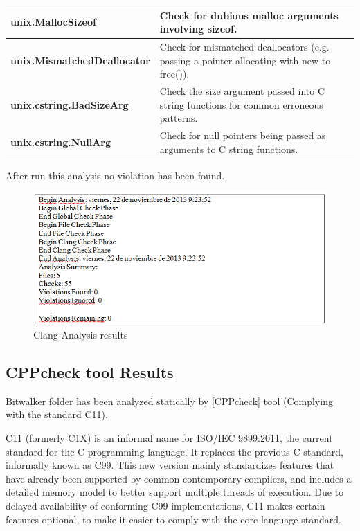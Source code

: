 {\begin{longtable}{||p{}|p{}||}
    \\
    \hline
    \textbf{unix.MallocSizeof}
& Check for dubious malloc arguments involving sizeof.
    \\
    \hline
    \textbf{unix.MismatchedDeallocator}
& Check for mismatched deallocators (e.g. passing a pointer allocating with new to free()).
    \\
    \hline
    \textbf{unix.cstring.BadSizeArg}
& Check the size argument passed into C string functions for common erroneous patterns.
    \\
    \hline
    \textbf{unix.cstring.NullArg}
& Check for null pointers being passed as arguments to C string functions.
    \\
    \hline
\end{longtable}}

After run this analysis no violation has been found.

\begin{figure}[H]
\centering
\includegraphics[scale=0.8]{./figures/clang.png}
\caption{Clang Analysis results}
\end{figure}

\subsection{CPPcheck tool Results}

Bitwalker folder has been analyzed statically by \href{http://cppcheck.sourceforge.net/}{[CPPcheck]} tool (Complying with the standard C11).

C11 (formerly C1X) is an informal name for ISO/IEC 9899:2011, the current standard for the C programming language. It replaces the previous C standard, informally known as C99. This new version mainly standardizes features that have already been supported by common contemporary compilers, and includes a detailed memory model to better support multiple threads of execution. Due to delayed availability of conforming C99 implementations, C11 makes certain features optional, to make it easier to comply with the core language standard.
 
